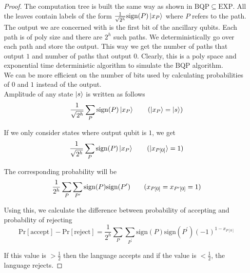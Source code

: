 \documentclass[../main.tex]{subfiles}
\begin{document}
\begin{proof}
The computation tree is built the same way as shown in $\mathrm{BQP}\subseteq\mathrm{EXP}$. All the leaves contain labels of the form $\frac{1}{\sqrt{2^h}}\mathrm{sign}(P)\ket{x_P}$ where $P$ refers to the path.\\

\noindent The output we are concerned with is the first bit of the ancillary qubits. Each path is of poly size and there are $2^h$ such paths. We deterministically go over each path and store the output. This way we get the number of paths that output $1$ and number of paths that output $0$. Clearly, this is a poly space and exponential time deterministic algorithm to simulate the $\mathrm{BQP}$ algorithm.\\

\noindent We can be more efficient on the number of bits used by calculating probabilities of $0$ and $1$ instead of the output.\\

\noindent Amplitude of any state $\ket{s}$ is written as follows
\begin{equation*}
    \frac{1}{\sqrt{2^h}}\sum_P\mathrm{sign}(P)\ket{x_P} \tag{$\ket{x_P} = \ket{s}$}
\end{equation*}

\noindent If we only consider states where output qubit is $1$, we get
\begin{equation*}
    \frac{1}{\sqrt{2^h}}\sum_P\mathrm{sign}(P)\ket{x_P} \tag{$\ket{x_{P[0]}} = 1$}
\end{equation*}

\noindent The corresponding probability will be
\begin{equation*}
    \frac{1}{2^h}\sum_P\sum_{P^\prime}\mathrm{sign}(P)\mathrm{sign}(P^\prime)\tag{$x_{P[0]}=x_{P^\prime[0]}=1$}
\end{equation*}

\noindent Using this, we calculate the difference between probability of accepting and probability of rejecting
\begin{equation*}
    \mathrm{Pr[accept]}-\mathrm{Pr[reject]} = \frac{1}{2^h}\sum_P\sum_{P^\prime}\mathrm{sign}(P)\mathrm{sign}(P^\prime)(-1)^{1-x_{P[0]}}
\end{equation*}

\noindent If this value is $>\frac{1}{2}$ then the language accepts and if the value is $<\frac{1}{2}$, the language rejects.
\end{proof}
\end{document}
